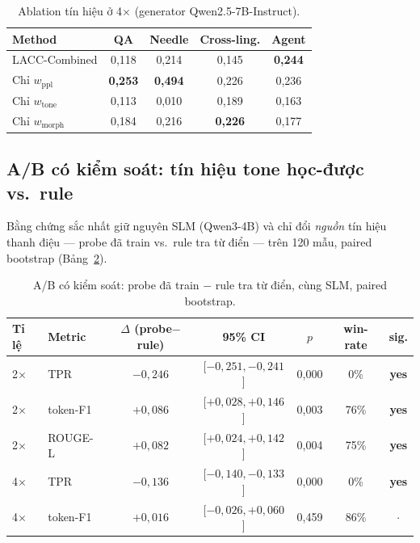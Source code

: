 \documentclass[runningheads]{llncs}
\begin{document}
\begin{table}[H]
\centering
\caption{Ablation tín hiệu ở 4$\times$ (generator Qwen2.5-7B-Instruct).}
\label{tab:ablation}
\begin{tabular}{lcccc}
\toprule
\textbf{Method} & \textbf{QA} & \textbf{Needle} & \textbf{Cross-ling.} & \textbf{Agent} \\
\midrule
LACC-Combined & 0,118 & 0,214 & 0,145 & \textbf{0,244} \\
Chỉ $w_{\text{ppl}}$ & \textbf{0,253} & \textbf{0,494} & 0,226 & 0,236 \\
Chỉ $w_{\text{tone}}$ & 0,113 & 0,010 & 0,189 & 0,163 \\
Chỉ $w_{\text{morph}}$ & 0,184 & 0,216 & \textbf{0,226} & 0,177 \\
\bottomrule
\end{tabular}
\end{table}

\subsection{A/B có kiểm soát: tín hiệu tone học-được vs.\ rule}

Bằng chứng sắc nhất giữ nguyên SLM (Qwen3-4B) và chỉ đổi \emph{nguồn} tín hiệu thanh điệu --- probe đã train vs.\ rule tra từ điển --- trên 120 mẫu, paired bootstrap (Bảng~\ref{tab:ab}).

\begin{table}[H]
\centering
\caption{A/B có kiểm soát: probe đã train $-$ rule tra từ điển, cùng SLM, paired bootstrap.}
\label{tab:ab}
\begin{tabular}{llccccc}
\toprule
\textbf{Tỉ lệ} & \textbf{Metric} & \textbf{$\Delta$ (probe$-$rule)} & \textbf{95\% CI} & \textbf{$p$} & \textbf{win-rate} & \textbf{sig.} \\
\midrule
2$\times$ & TPR      & $-0{,}246$ & [$-0{,}251,-0{,}241$] & 0,000 & 0\% & \textbf{yes} \\
2$\times$ & token-F1 & $+0{,}086$ & [$+0{,}028,+0{,}146$] & 0,003 & 76\% & \textbf{yes} \\
2$\times$ & ROUGE-L  & $+0{,}082$ & [$+0{,}024,+0{,}142$] & 0,004 & 75\% & \textbf{yes} \\
4$\times$ & TPR      & $-0{,}136$ & [$-0{,}140,-0{,}133$] & 0,000 & 0\% & \textbf{yes} \\
4$\times$ & token-F1 & $+0{,}016$ & [$-0{,}026,+0{,}060$] & 0,459 & 86\% & $\cdot$ \\
\bottomrule
\end{tabular}
\end{table}
\end{document}
